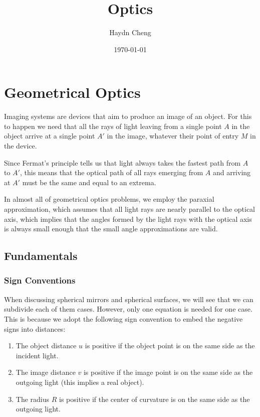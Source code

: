 \documentclass[english,a4paper,12pt]{report}
\title{Optics}
\author{Haydn Cheng}
\date{\today}
\begin{document}
\maketitle
\tableofcontents
    
\chapter{Geometrical Optics}

Imaging systems are devices that aim to produce an image of an object. For this to happen we need that all the rays of light leaving from a single point \(A\) in the object arrive at a single point \(A'\) in the image, whatever their point of entry \(M\) in the device. 

Since Fermat's principle tells us that light always takes the fastest path from \(A\) to \(A'\), this means that the optical path of all rays emerging from \(A\) and arriving at \(A'\) must be the same and equal to an extrema.   

In almost all of geometrical optics problems, we employ the paraxial approximation, which assumes that all light rays are nearly parallel to the optical axis, which implies that the angles formed by the light rays with the optical axis is always small enough that the small angle approximations are valid.

\section{Fundamentals}

\subsection{Sign Conventions}

When discussing spherical mirrors and spherical surfaces, we will see that we can subdivide each of them cases. However, only one equation is needed for one case. This is because we adopt the following sign convention to embed the negative signs into distances:

\begin{enumerate}
    \item The object distance \(u\) is positive if the object point is on the same side as the incident light.
    \item The image distance \(v\) is positive if the image point is on the same side as the outgoing light (this implies a real object).
    \item The radius \(R\) is positive if the center of curvature is on the same side as the outgoing light.
\end{enumerate}
\end{document}
